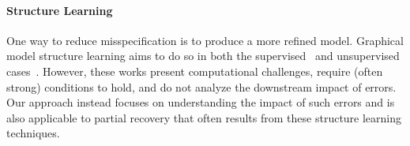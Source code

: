 \paragraph{Structure Learning}
One way to reduce misspecification is to produce a more refined model. Graphical model structure learning aims to do so in both the supervised~\citep{Ravikumar11, Loh13} and unsupervised cases~\citep{Chandrasekaran12,Meng14, bach2017learning, varma2019learning}. However, these works present computational challenges, require (often strong) conditions to hold, and do not analyze the downstream impact of errors. Our approach instead focuses on understanding the impact of such errors and is also applicable to partial recovery that often results from these structure learning techniques.




